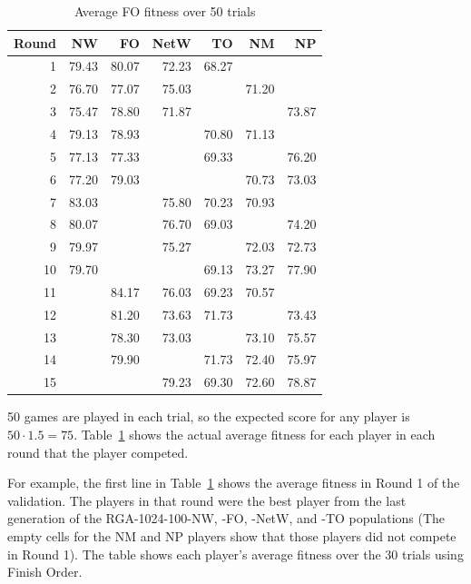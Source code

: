 \begin{table}[htbp]
  \centering
  \caption{Average FO fitness over 50 trials}
    \begin{tabular}{rrrrrrr}
    \toprule
    Round & NW    & FO    & NetW  & TO    & NM    & NP \\
    \midrule
    1     & 79.43 & 80.07 & 72.23 & 68.27 &       &       \\
    2     & 76.70 & 77.07 & 75.03 &       & 71.20 &       \\
    3     & 75.47 & 78.80 & 71.87 &       &       & 73.87 \\
    4     & 79.13 & 78.93 &       & 70.80 & 71.13 &       \\
    5     & 77.13 & 77.33 &       & 69.33 &       & 76.20 \\
    6     & 77.20 & 79.03 &       &       & 70.73 & 73.03 \\
    7     & 83.03 &       & 75.80 & 70.23 & 70.93 &       \\
    8     & 80.07 &       & 76.70 & 69.03 &       & 74.20 \\
    9     & 79.97 &       & 75.27 &       & 72.03 & 72.73 \\
    10    & 79.70 &       &       & 69.13 & 73.27 & 77.90 \\
    11    &       & 84.17 & 76.03 & 69.23 & 70.57 &       \\
    12    &       & 81.20 & 73.63 & 71.73 &       & 73.43 \\
    13    &       & 78.30 & 73.03 &       & 73.10 & 75.57 \\
    14    &       & 79.90 &       & 71.73 & 72.40 & 75.97 \\
    15    &       &       & 79.23 & 69.30 & 72.60 & 78.87 \\
    \bottomrule
    \end{tabular}%
  \label{tab:interpop_avgfitness}%
\end{table}%

50 games are played in each trial, so the expected score for any player is \(50
\cdot 1.5 = 75\). Table~\ref{tab:interpop_avgfitness} shows the actual average
fitness for each player in each round that the player competed.

For example, the first line in Table~\ref{tab:interpop_avgfitness} shows the
average fitness in Round 1 of the validation. The players in that round were the
best player from the last generation of the RGA-1024-100-NW, -FO, -NetW, and -TO
populations (The empty cells for the NM and NP players show that those players
did not compete in Round 1). The table shows each player's average fitness over
the 30 trials using Finish Order.

